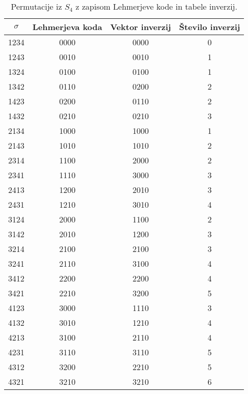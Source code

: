 \documentclass[a4paper, 12pt]{book}
\begin{document}
\begin{table}
    \begin{center}
        \begin{tabular}{ |c|c|c|c| } 
        \hline
            $\sigma$ & Lehmerjeva koda & Vektor inverzij & Število inverzij \\ 
        \hline
            1234 & 0000 & 0000 & 0 \\ 
        \hline
            1243 & 0010 & 0010 & 1 \\ 
        \hline
            1324 & 0100 & 0100 & 1 \\ 
        \hline
            1342 & 0110 & 0200 & 2 \\ 
        \hline
            1423 & 0200 & 0110 & 2 \\ 
        \hline
            1432 & 0210 & 0210 & 3 \\ 
        \hline
            2134 & 1000 & 1000 & 1 \\ 
        \hline
            2143 & 1010 & 1010 & 2 \\ 
        \hline
            2314 & 1100 & 2000 & 2 \\ 
        \hline
            2341 & 1110 & 3000 & 3 \\ 
        \hline
            2413 & 1200 & 2010 & 3 \\ 
        \hline
            2431 & 1210 & 3010 & 4 \\ 
        \hline
            3124 & 2000 & 1100 & 2 \\ 
        \hline
            3142 & 2010 & 1200 & 3 \\ 
        \hline
            3214 & 2100 & 2100 & 3 \\ 
        \hline
            3241 & 2110 & 3100 & 4 \\ 
        \hline
            3412 & 2200 & 2200 & 4 \\ 
        \hline
            3421 & 2210 & 3200 & 5 \\ 
        \hline
            4123 & 3000 & 1110 & 3 \\ 
        \hline
            4132 & 3010 & 1210 & 4 \\ 
        \hline
            4213 & 3100 & 2110 & 4 \\ 
        \hline
            4231 & 3110 & 3110 & 5 \\
        \hline
            4312 & 3200 & 2210 & 5 \\ 
        \hline
            4321 & 3210 & 3210 & 6 \\ 
        \hline
        \end{tabular}
    \end{center}
    \caption{ Permutacije iz $S_4$ z zapisom Lehmerjeve kode in tabele inverzij. }
    \label{tbl:permutacije4vektorji}
\end{table}
\end{document}
